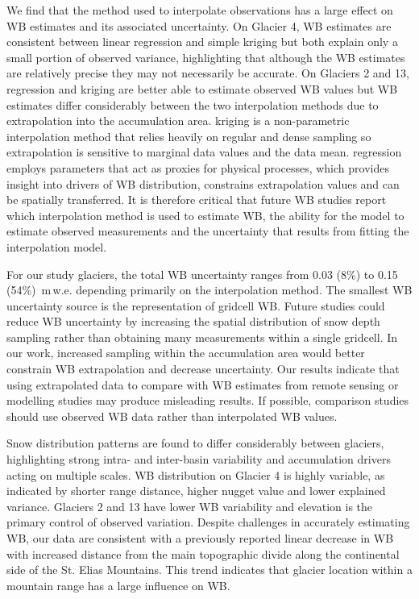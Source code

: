 \documentclass{sfuthesis}
\begin{document}
We find that the method used to interpolate observations has a large effect on WB estimates and its associated uncertainty. On Glacier 4, WB estimates are consistent between linear regression and simple kriging but both explain only a small portion of observed variance, highlighting that although the WB estimates are relatively precise they may not necessarily be accurate. On Glaciers 2 and 13, regression and kriging are better able to estimate observed WB values but WB estimates differ considerably between the two interpolation methods due to extrapolation into the accumulation area. kriging is a non-parametric interpolation method that relies heavily on regular and dense sampling so extrapolation is sensitive to marginal data values and the data mean. regression employs parameters that act as proxies for physical processes, which provides insight into drivers of WB distribution, constrains extrapolation values and can be spatially transferred. It is therefore critical that future WB studies report which interpolation method is used to estimate WB, the ability for the model to estimate observed measurements and the uncertainty that results from fitting the interpolation model. 

For our study glaciers, the total WB uncertainty ranges from 0.03 (8\%) to 0.15 (54\%) \,m\,w.e. depending primarily on the interpolation method. The smallest WB uncertainty source is the representation of gridcell WB. Future studies could reduce WB uncertainty by increasing the spatial distribution of snow depth sampling rather than obtaining many measurements within a single gridcell. In our work, increased sampling within the accumulation area would better constrain WB extrapolation and decrease uncertainty. Our results indicate that using extrapolated data to compare with WB estimates from remote sensing or modelling studies may produce misleading results. If possible, comparison studies should use observed WB data rather than interpolated WB values. 

Snow distribution patterns are found to differ considerably between glaciers, highlighting strong intra- and inter-basin variability and accumulation drivers acting on multiple scales. WB distribution on Glacier 4 is highly variable, as indicated by shorter range distance, higher nugget value and lower explained variance. Glaciers 2 and 13 have lower WB variability and elevation is the primary control of observed variation. Despite challenges in accurately estimating WB, our data are consistent with a previously reported linear decrease in WB with increased distance from the main topographic divide along the continental side of the St. Elias Mountains. This trend indicates that glacier location within a mountain range has a large influence on WB. 
\end{document}
